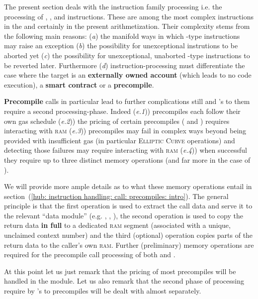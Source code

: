 The present section deals with the  instruction family processing i.e. the processing of
, ,  and  instructions.
These are among the most complex instructions in the \evm{} and certainly in the present arithmetization.
Their complexity stems from the following main reasons:
(\emph{a}) the manifold ways in which -type instructions may raise an exception
(\emph{b}) the possibility for unexceptional instrutions to be aborted yet
(\emph{c}) the possibility for unexceptional, unaborted -type instructions to be reverted later.
Furthermore
(\emph{d}) instruction-processing must differentiate the case where the target is an \textbf{externally owned account} (which leads to no code execution), a \textbf{smart contract} or a \textbf{precompile}.

\textbf{Precompile} calls in particular lead to further complications still and 's to them require a second processing-phase.
Indeed
(\emph{e.1})) precompiles each follow their own gas schedule
(\emph{e.2})) the pricing of certain precompiles ( and ) requires interacting with \textsc{ram}
(\emph{e.3})) precompiles may fail in complex ways beyond being provided with insufficient gas (in particular \textsc{Elliptic Curve} operations) and detecting those failures may require interacting with \textsc{ram}
(\emph{e.4})) when successful they require up to three distinct memory operations (and far more in the case of ).

We will provide more ample details as to what these memory operations entail in section~(\ref{hub: instruction handling: call: precompiles: intro}).
The general principle is that
the first operation is used to extract the call data and serve it to the relevant ``data module'' (e.g. \shakiraMod{}, \ecDataMod{}, \blkMdxMod{}),
the second operation is used to copy the return data \textbf{in full} to a dedicated \textsc{ram} segment (associated with a unique, unclaimed context number) and
the third (optional) operation copies parts of the return data to the caller's own \textsc{ram}.
Further (preliminary) memory operations are required for the precompile call processing of both  and .

At this point let us just remark that the pricing of most precompiles will be handled in the \oobMod{} module. Let us also remark that the second phase of processing require by 's to precompiles will be dealt with almost separately. 
